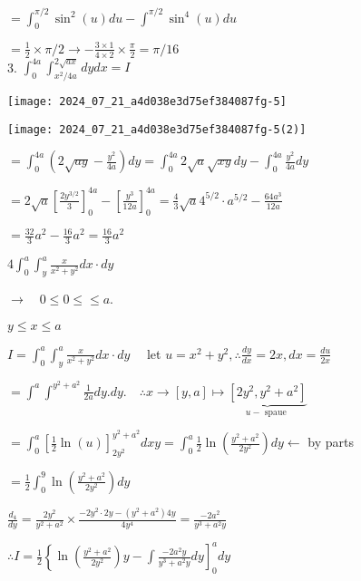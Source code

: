 \documentclass[12pt, a4paper]{article}
\begin{document}
$=\int_{0}^{\pi / 2} \sin ^{2}(u) d u-\int^{\pi / 2} \sin ^{4}(u) d u$

$=\frac{1}{2} \times \pi / 2 \rightarrow-\frac{3 \times 1}{4 \times 2} \times \frac{\pi}{2}=\pi / 16$\\
3. $\int_{0}^{4 a} \int_{x^{2} / 4 a}^{2 \sqrt{a x}} d y d x=I$

\begin{center}
\texttt{[image: 2024\_07\_21\_a4d038e3d75ef384087fg-5]}
\end{center}

\begin{center}
\texttt{[image: 2024\_07\_21\_a4d038e3d75ef384087fg-5(2)]}
\end{center}

$=\int_{0}^{4 a}\left(2 \sqrt{a y}-\frac{y^{2}}{4 a}\right) d y=\int_{0}^{4 a} 2 \sqrt{a} \sqrt{x y} d y-\int_{0}^{4 a} \frac{y^{2}}{4 a} d y$

$=2 \sqrt{a}\left[\frac{2 y^{3 / 2}}{3}\right]_{0}^{4 a}-\left[\frac{y^{3}}{12 a}\right]_{0}^{4 a}=\frac{4}{3} \sqrt{a} 4^{5 / 2} \cdot a^{5 / 2}-\frac{64 a^{3}}{12 a}$

$=\frac{32}{3} a^{2}-\frac{16}{3} a^{2}=\frac{16}{3} a^{2}$

$4 \int_{0}^{a} \int_{y}^{a} \frac{x}{x^{2}+y^{2}} d x \cdot d y$

$\rightarrow \quad 0 \leq 0 \leq \leq a$.

$y \leq x \leq a$

$I=\int_{0}^{a} \int_{y}^{a} \frac{x}{x^{2}+y^{2}} d x \cdot d y \quad$ let $u=x^{2}+y^{2}, \therefore \frac{d y}{d x}=2 x, d x=\frac{d u}{2 x}$

$=\int^{a} \int^{y^{2}+a^{2}} \frac{1}{2 a} d y . d y . \quad \therefore x \rightarrow[y, a] \longmapsto \underbrace{\left[2 y^{2}, y^{2}+a^{2}\right]}_{u-\text { spaue }}$

$=\int_{0}^{a}\left[\frac{1}{2} \ln (u)\right]_{2 y^{2}}^{y^{2}+a^{2}} d x y=\int_{0}^{a} \frac{1}{2} \ln \left(\frac{y^{2}+a^{2}}{2 y^{2}}\right) d y \leftarrow$ by parts

$=\frac{1}{2} \int_{0}^{9} \ln \left(\frac{y^{2}+a^{2}}{2 y^{2}}\right) d y$

$\frac{d_{4}}{d y}=\frac{2 y^{2}}{y^{2}+a^{2}} \times \frac{-2 y^{2} \cdot 2 y-\left(y^{2}+a^{2}\right) 4 y}{4 y^{4}}=\frac{-2 a^{2}}{y^{3}+a^{2} y}$

$\therefore I=\frac{1}{2}\left\{\ln \left(\frac{y^{2}+a^{2}}{2 y^{2}}\right) y-\int \frac{-2 a^{2} y}{y^{3}+a^{2} y} d y\right]_{0}^{a} d y$
\end{document}
